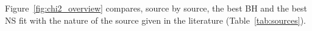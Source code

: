 Figure~\ref{fig:chi2_overview} compares, source by source, the best BH and the best NS fit with the nature of the source given in the literature (Table~\ref{tab:sources}).
